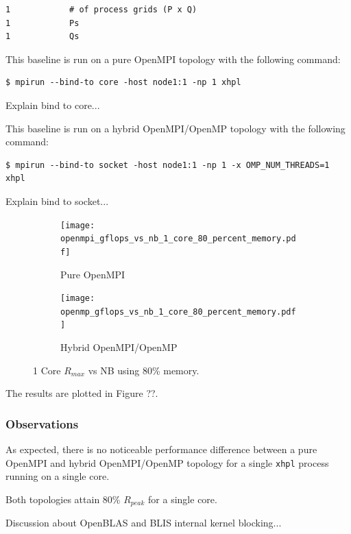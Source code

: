 \documentclass{report}
\begin{document}
\lstset{style=listing}
\begin{lstlisting}[numbers=none]
1            # of process grids (P x Q)
1            Ps
1            Qs
\end{lstlisting}

This baseline is run on a pure OpenMPI topology with the following command:

\lstset{style=type}
\begin{lstlisting}[]
$ mpirun --bind-to core -host node1:1 -np 1 xhpl
\end{lstlisting}

Explain bind to core...

This baseline is run on a hybrid OpenMPI/OpenMP topology with the following command:

\lstset{style=type}
\begin{lstlisting}[]
$ mpirun --bind-to socket -host node1:1 -np 1 -x OMP_NUM_THREADS=1 xhpl
\end{lstlisting}

Explain bind to socket...

\begin{figure}
	\begin{subfigure}{1.0\textwidth}
		\centering
		\texttt{[image: openmpi\_gflops\_vs\_nb\_1\_core\_80\_percent\_memory.pdf]}
		\caption{Pure OpenMPI}
		\label{fig:subim1}
	\end{subfigure}
	\par\bigskip
	\begin{subfigure}{1.0\textwidth}
		\centering
		\texttt{[image: openmp\_gflops\_vs\_nb\_1\_core\_80\_percent\_memory.pdf]}
		\caption{Hybrid OpenMPI/OpenMP}
		\label{fig:subim2}
	\end{subfigure}
\caption{1 Core $R_{max}$ vs NB using 80\% memory.}
\label{fig:image2}
\end{figure}

The results are plotted in Figure ??.


%
%
\subsubsection{Observations}

As expected, there is no noticeable performance difference between a pure OpenMPI and hybrid OpenMPI/OpenMP topology for a single \verb|xhpl| process running on a single core.

Both topologies attain 80\% $R_{peak}$ for a single core.

Discussion about OpenBLAS and BLIS internal kernel blocking...
\end{document}
